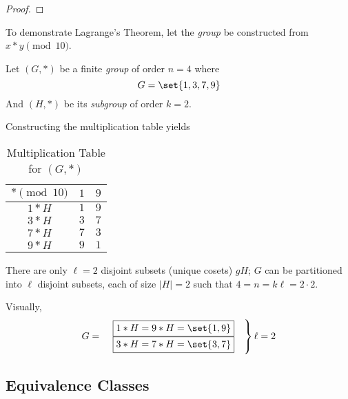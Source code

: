 \begin{proof}
\end{proof}

\begin{remark}
    To demonstrate Lagrange's Theorem, let the \textit{group} be constructed from $x \ast y \pmod{10}$.
    
    Let $(G, \ast)$ be a finite \textit{group} of order $n = 4$ where
    \begin{equation}
        G = \set{1, 3, 7, 9}
    \end{equation}
    And $(H, \ast)$ be its \textit{subgroup} of order $k = 2$.
    
    Constructing the multiplication table yields
    \begin{table}[H]
    \centering
    \begin{tabular}{c | c c}
    \toprule
    $\ast \pmod{10}$ & $1$ & $9$ \\
     \midrule
    $1 \ast H$       & $1$ & $9$ \\
    $3 \ast H$       & $3$ & $7$ \\
    $7 \ast H$       & $7$ & $3$ \\
    $9 \ast H$       & $9$ & $1$ \\ 
    \bottomrule
    \end{tabular}
    \caption{Multiplication Table for $(G, \ast)$}
    \end{table}
    
    There are only $\ell = 2$ disjoint subsets (unique cosets) $gH$; $G$ can be partitioned into $\ell$ disjoint subsets, each of size $\lvert H \rvert = 2$ such that $4 = n = k\ell = 2 \cdot 2$.
    
    Visually,
    \begin{equation}
        G = \left. \begin{matrix}
            &\boxed{1 \ast H = 9 \ast H = \set{1, 9}} \\
            &\boxed{3 \ast H = 7 \ast H = \set{3, 7}}
        \end{matrix} \quad \right\} \ell = 2
    \end{equation}
\end{remark}

\subsection{Equivalence Classes}

